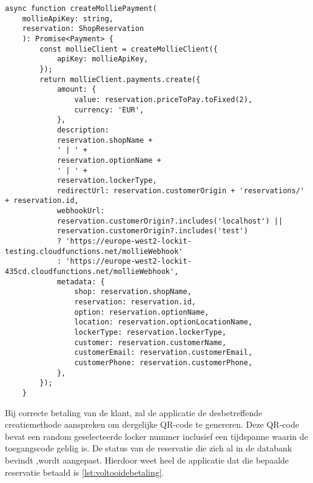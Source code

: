 \begin{lstlisting}[caption={Mollie betaling aanmaken met nodige data.}, label={lst:aanmakenBetalingMollie}]
    async function createMolliePayment(
    mollieApiKey: string,
    reservation: ShopReservation
    ): Promise<Payment> {
        const mollieClient = createMollieClient({
            apiKey: mollieApiKey,
        });
        return mollieClient.payments.create({
            amount: {
                value: reservation.priceToPay.toFixed(2),
                currency: 'EUR',
            },
            description:
            reservation.shopName +
            ' | ' +
            reservation.optionName +
            ' | ' +
            reservation.lockerType,
            redirectUrl: reservation.customerOrigin + 'reservations/' + reservation.id,
            webhookUrl:
            reservation.customerOrigin?.includes('localhost') ||
            reservation.customerOrigin?.includes('test')
            ? 'https://europe-west2-lockit-testing.cloudfunctions.net/mollieWebhook'
            : 'https://europe-west2-lockit-435cd.cloudfunctions.net/mollieWebhook',
            metadata: {
                shop: reservation.shopName,
                reservation: reservation.id,
                option: reservation.optionName,
                location: reservation.optionLocationName,
                lockerType: reservation.lockerType,
                customer: reservation.customerName,
                customerEmail: reservation.customerEmail,
                customerPhone: reservation.customerPhone,
            },
        });
    }
    \end{lstlisting}

Bij correcte betaling van de klant, zal de applicatie de desbetreffende creatiemethode aanspreken om dergelijke QR-code te genereren. Deze QR-code bevat een random geselecteerde locker nummer inclusief een tijdspanne waarin de toegangscode geldig is. De status van de reservatie die zich al in de databank bevindt ,wordt aangepast. Hierdoor weet heel de applicatie dat die bepaalde reservatie betaald is \ref{lst:voltooidebetaling}.


